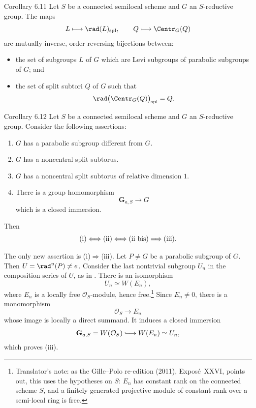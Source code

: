 \begin{sgastatement}{Corollary 6.11}
Let \(S\) be a connected semilocal scheme and \(G\) an
\(S\)-reductive group.  The maps
\[
 L\longmapsto\rad(L)_{\mathrm{spl}},
 \qquad
 Q\longmapsto\Centr_G(Q)
\]
are mutually inverse, order-reversing bijections between:
\begin{itemize}
\item the set of subgroups \(L\) of \(G\) which are Levi subgroups
of parabolic subgroups of \(G\); and
\item the set of split subtori \(Q\) of \(G\) such that
\[
 \rad\bigl(\Centr_G(Q)\bigr)_{\mathrm{spl}}=Q.
\]
\end{itemize}
\end{sgastatement}

\begin{sgastatement}{Corollary 6.12}
Let \(S\) be a connected semilocal scheme and \(G\) an
\(S\)-reductive group.  Consider the following assertions:
\begin{enumerate}[label=\textup{(\roman*)}]
\item \(G\) has a parabolic subgroup different from \(G\).
\item \(G\) has a noncentral split subtorus.
\item[\textup{(ii bis)}] \(G\) has a noncentral split subtorus of
relative dimension \(1\).
\item There is a group homomorphism
\[
 \mathbf G_{a,S}\longrightarrow G
\]
which is a closed immersion.
\end{enumerate}
Then
\[
 \textup{(i)}
 \Longleftrightarrow\textup{(ii)}
 \Longleftrightarrow\textup{(ii bis)}
 \Longrightarrow\textup{(iii)}.
\]
\end{sgastatement}

The only new assertion is
\textup{(i)}\(\Rightarrow\)\textup{(iii)}.  Let \(P\ne G\) be a
parabolic subgroup of \(G\).  Then \(U=\rad^u(P)\ne e\).  Consider
the last nontrivial subgroup \(U_n\) in the composition series of
\(U\), as in .  There is an isomorphism
\[
 U_n\simeq W(E_n),
\]
where \(E_n\) is a locally free \(\mathcal O_S\)-module, hence
free.\footnote{Translator's note: as the Gille--Polo re-edition (2011), Exposé~XXVI,
points out, this uses the hypotheses on \(S\): \(E_n\) has constant rank on
the connected scheme \(S\), and a finitely generated projective module of
constant rank over a semi-local ring is free.}  Since
\(E_n\ne0\), there is a monomorphism
\[
 \mathcal O_S\longrightarrow E_n
\]
whose image is locally a direct summand.  It induces a closed
immersion
\[
 \mathbf G_{a,S}=W(\mathcal O_S)
   \lhook\joinrel\longrightarrow W(E_n)\simeq U_n,
\]
which proves \textup{(iii)}.

